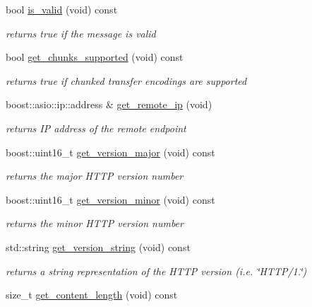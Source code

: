 \begin{DoxyCompactItemize}
bool \hyperlink{classpion_1_1http_1_1message_a52850e6fe48b141f46662c83d4edbbf5}{is\-\_\-valid} (void) const 
\begin{DoxyCompactList}\small\item\em returns true if the message is valid \end{DoxyCompactList}\item 
bool \hyperlink{classpion_1_1http_1_1message_a42ea3cfa8633a99a9c517afe2db00a1a}{get\-\_\-chunks\-\_\-supported} (void) const 
\begin{DoxyCompactList}\small\item\em returns true if chunked transfer encodings are supported \end{DoxyCompactList}\item 
boost\-::asio\-::ip\-::address \& \hyperlink{classpion_1_1http_1_1message_a42fdde8d94227c6d08d475c5ed8a6388}{get\-\_\-remote\-\_\-ip} (void)
\begin{DoxyCompactList}\small\item\em returns I\-P address of the remote endpoint \end{DoxyCompactList}\item 
boost\-::uint16\-\_\-t \hyperlink{classpion_1_1http_1_1message_a6d36c13df002129d3044d9c34999161d}{get\-\_\-version\-\_\-major} (void) const 
\begin{DoxyCompactList}\small\item\em returns the major H\-T\-T\-P version number \end{DoxyCompactList}\item 
boost\-::uint16\-\_\-t \hyperlink{classpion_1_1http_1_1message_ac986c7014db695241db1823f17eda4cd}{get\-\_\-version\-\_\-minor} (void) const 
\begin{DoxyCompactList}\small\item\em returns the minor H\-T\-T\-P version number \end{DoxyCompactList}\item 
std\-::string \hyperlink{classpion_1_1http_1_1message_a0bb6e14bd27dc1b956bb74dcccc7ee27}{get\-\_\-version\-\_\-string} (void) const 
\begin{DoxyCompactList}\small\item\em returns a string representation of the H\-T\-T\-P version (i.\-e. \char`\"{}\-H\-T\-T\-P/1.\char`\"{}) \end{DoxyCompactList}\item 
size\-\_\-t \hyperlink{classpion_1_1http_1_1message_a10606f8fd2efbe14d447ef8eb8731a54}{get\-\_\-content\-\_\-length} (void) const 

\end{DoxyCompactItemize}
